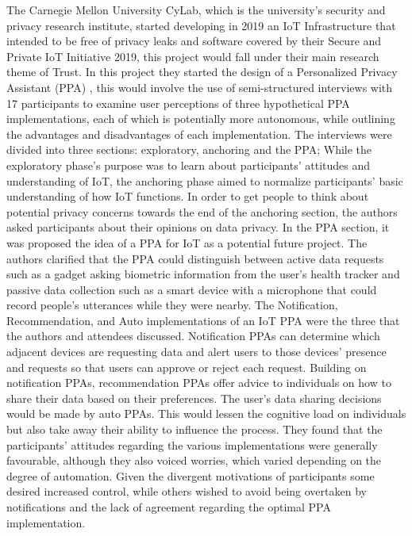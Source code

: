 The Carnegie Mellon University CyLab, which is the university's security
and privacy research institute, started developing in 2019 an IoT Infrastructure
that intended to be free of privacy leaks and software covered by their
Secure and Private IoT Initiative 2019, this project would fall under
their main research theme of Trust. In this project they started the design
of a Personalized Privacy Assistant (PPA) \cite{ColnagoInforming}, this
would involve the use of semi-structured interviews with 17 participants
to examine user perceptions of three hypothetical PPA implementations,
each of which is potentially more autonomous, while outlining the advantages
and disadvantages of each implementation. The interviews were divided into
three sections: exploratory, anchoring and the PPA; While the exploratory
phase's purpose was to learn about participants' attitudes and understanding
of IoT, the anchoring phase aimed to normalize participants' basic understanding
of how IoT functions. In order to get people to think about potential privacy
concerns towards the end of the anchoring section, the authors asked participants
about their opinions on data privacy. In the PPA section, it was proposed
the idea of a PPA for IoT as a potential future project. The authors clarified
that the PPA could distinguish between active data requests such as a gadget
asking biometric information from the user's health tracker and passive
data collection such as a smart device with a microphone that could record
people's utterances while they were nearby. The Notification, Recommendation,
and Auto implementations of an IoT PPA were the three that the authors and
attendees discussed. Notification PPAs can determine which adjacent devices
are requesting data and alert users to those devices' presence and requests
so that users can approve or reject each request. Building on notification
PPAs, recommendation PPAs offer advice to individuals on how to share their data
based on their preferences. The user's data sharing decisions would be made
by auto PPAs. This would lessen the cognitive load on individuals but also
take away their ability to influence the process. They found that the participants'
attitudes regarding the various implementations were generally favourable,
although they also voiced worries, which varied depending on the degree
of automation. Given the divergent motivations of participants some desired
increased control, while others wished to avoid being overtaken by notifications
and the lack of agreement regarding the optimal PPA implementation.

